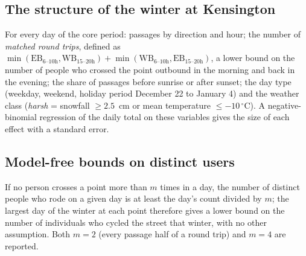 \documentclass[11pt,a4paper]{article}
\begin{document}
\subsection{The structure of the winter at Kensington}
For every day of the core period: passages by direction and hour; the number of \emph{matched round trips}, defined as $\min(\text{EB}_{6\text{--}10\text{h}}, \text{WB}_{15\text{--}20\text{h}}) + \min(\text{WB}_{6\text{--}10\text{h}}, \text{EB}_{15\text{--}20\text{h}})$, a lower bound on the number of people who crossed the point outbound in the morning and back in the evening; the share of passages before sunrise or after sunset; the day type (weekday, weekend, holiday period December 22 to January 4) and the weather class (\emph{harsh} = snowfall $\geq 2.5$~cm or mean temperature $\leq -10\,^\circ$C). A negative-binomial regression of the daily total on these variables gives the size of each effect with a standard error.
\subsection{Model-free bounds on distinct users}
If no person crosses a point more than $m$ times in a day, the number of distinct people who rode on a given day is at least the day\textquoteright{}s count divided by $m$; the largest day of the winter at each point therefore gives a lower bound on the number of individuals who cycled the street that winter, with no other assumption. Both $m = 2$ (every passage half of a round trip) and $m = 4$ are reported.
\end{document}
